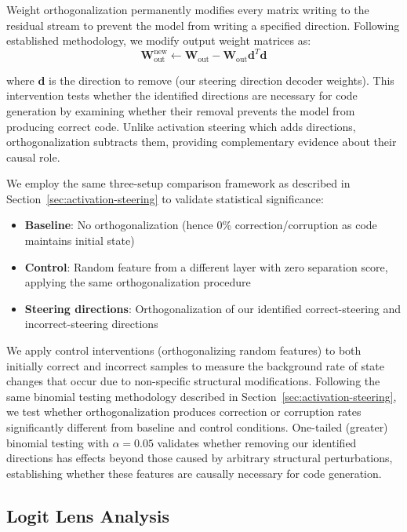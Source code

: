 Weight orthogonalization permanently modifies every matrix writing to the residual stream to prevent the model from writing a specified direction. Following established methodology, we modify output weight matrices as:
\begin{equation}
\mathbf{W}_{\text{out}}^{\text{new}} \leftarrow \mathbf{W}_{\text{out}} - \mathbf{W}_{\text{out}} \mathbf{d}^{T} \mathbf{d}
\end{equation}

where $\mathbf{d}$ is the direction to remove (our steering direction decoder weights). This intervention tests whether the identified directions are necessary for code generation by examining whether their removal prevents the model from producing correct code. Unlike activation steering which adds directions, orthogonalization subtracts them, providing complementary evidence about their causal role.

We employ the same three-setup comparison framework as described in Section~\ref{sec:activation-steering} to validate statistical significance:

\begin{itemize}
    \item \textbf{Baseline}: No orthogonalization (hence 0\% correction/corruption as code maintains initial state)
    \item \textbf{Control}: Random feature from a different layer with zero separation score, applying the same orthogonalization procedure
    \item \textbf{Steering directions}: Orthogonalization of our identified correct-steering and incorrect-steering directions
\end{itemize}

We apply control interventions (orthogonalizing random features) to both initially correct and incorrect samples to measure the background rate of state changes that occur due to non-specific structural modifications. Following the same binomial testing methodology described in Section~\ref{sec:activation-steering}, we test whether orthogonalization produces correction or corruption rates significantly different from baseline and control conditions. One-tailed (greater) binomial testing with $\alpha = 0.05$ validates whether removing our identified directions has effects beyond those caused by arbitrary structural perturbations, establishing whether these features are causally necessary for code generation.

\subsection{Logit Lens Analysis}

